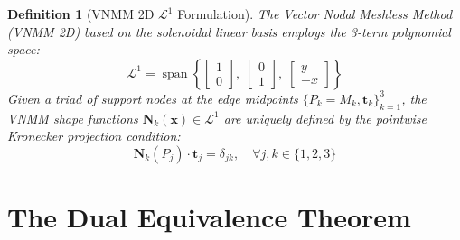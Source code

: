 \documentclass[11pt,a4paper]{article}
\newtheorem{definition}{Definition}
\begin{document}
\begin{definition}[VNMM 2D $\mathcal{L}^1$ Formulation]
The Vector Nodal Meshless Method (VNMM 2D) based on the solenoidal linear basis employs the 3-term polynomial space:
\begin{equation}
    \mathcal{L}^1 = \operatorname{span}\left\{ \begin{bmatrix} 1 \\ 0 \end{bmatrix}, \; \begin{bmatrix} 0 \\ 1 \end{bmatrix}, \; \begin{bmatrix} y \\ -x \end{bmatrix} \right\}
\end{equation}
Given a triad of support nodes at the edge midpoints $\{P_k = M_k, \mathbf{t}_k\}_{k=1}^3$, the VNMM shape functions $\mathbf{N}_k(\mathbf{x}) \in \mathcal{L}^1$ are uniquely defined by the pointwise Kronecker projection condition:
\begin{equation}
    \mathbf{N}_k(P_j) \cdot \mathbf{t}_j = \delta_{jk}, \quad \forall j, k \in \{1, 2, 3\}
\end{equation}
\end{definition}

\section{The Dual Equivalence Theorem}
\end{document}

